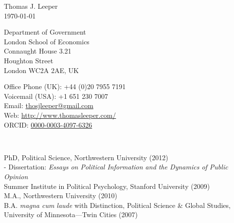 \documentclass[12pt]{article}
\renewcommand{\section}[1]{\pagebreak[3]%
    \llap{\scshape\smash{\parbox[t]{\marginparwidth}{\raggedright {\color{lg}#1}}}}%
    \vspace{-\baselineskip}\par}
\newcommand{\entry}[1]{\indent {\color{lg}\guillemotright}\hspace{2pt}#1\vspace{.25em}\\}
\newcommand{\subentry}[1]{{\color{lg}-} #1\vspace{.25em}\\}
\begin{document}
{\LARGE Thomas J. Leeper}\\

\today\\

\begin{minipage}[b]{0.5\linewidth}
Department of Government\\
London School of Economics\\
Connaught House 3.21\\
Houghton Street\\
London WC2A 2AE, UK
\end{minipage}
\begin{minipage}[b]{0.5\linewidth}
Office Phone (UK): +44 (0)20 7955 7191\\
Voicemail (USA): +1 651 230 7007\\
Email: \href{mailto:thosjleeper@gmail.com}{thosjleeper@gmail.com}\\
Web: \href{http://www.thomasleeper.com/}{http://www.thomasleeper.com/}\\
ORCID: \href{http://orcid.org/0000-0003-4097-6326}{0000-0003-4097-6326}
\end{minipage}\\

\section{Education}
\entry{PhD, Political Science, Northwestern University (2012)}
\subentry{Dissertation: {\em Essays on Political Information and the Dynamics of Public Opinion}}
\entry{Summer Institute in Political Psychology, Stanford University (2009)}
\entry{M.A., Northwestern University (2010)}
\entry{B.A. {\em magna cum laude} with Distinction, Political Science \& Global Studies, University of Minnesota---Twin Cities (2007)}
\end{document}
